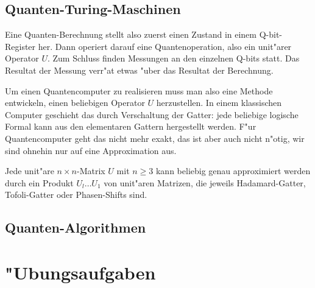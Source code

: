 \subsection{Quanten-Turing-Maschinen}
Eine Quanten-Berechnung stellt also zuerst einen Zustand in einem
Q-bit-Register her.
Dann operiert darauf eine Quantenoperation, also ein unit"arer Operator $U$.
Zum Schluss finden Messungen an den einzelnen Q-bits statt.
Das Resultat der Messung verr"at etwas "uber das Resultat der Berechnung.

Um einen Quantencomputer zu realisieren muss man also eine Methode
entwickeln, einen beliebigen Operator $U$ herzustellen.
In einem klassischen Computer geschieht das durch Verschaltung der
Gatter: jede beliebige logische Formal kann aus den elementaren
Gattern hergestellt werden.
F"ur Quantencomputer geht das nicht mehr exakt, das ist aber auch nicht
n"otig, wir sind ohnehin nur auf eine Approximation aus.

\begin{satz}
Jede unit"are $n\times n$-Matrix $U$ mit $n\ge 3$ kann beliebig genau
approximiert werden durch ein Produkt $U_l\dots U_1$ von unit"aren
Matrizen, die jeweils Hadamard-Gatter, Tofoli-Gatter oder Phasen-Shifts
sind.
\cite[Theorem 10.12]{skript:arorabarak}
\end{satz}

\subsection{Quanten-Algorithmen}

\section*{"Ubungsaufgaben}
\begin{uebungsaufgaben}
\item

\end{uebungsaufgaben}
